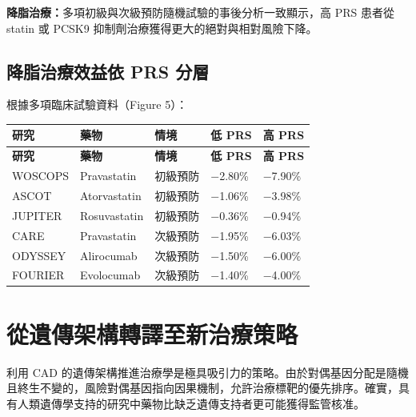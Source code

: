\documentclass[12pt,a4paper]{article}
\begin{document}
\textbf{降脂治療：}多項初級與次級預防隨機試驗的事後分析一致顯示，高 PRS 患者從 statin 或 PCSK9 抑制劑治療獲得更大的絕對與相對風險下降。

\subsection{降脂治療效益依 PRS 分層}

根據多項臨床試驗資料（Figure 5）：

\begin{longtable}{p{3cm}p{2.5cm}p{2.5cm}p{2.5cm}p{2.5cm}}
\toprule
\textbf{研究} & \textbf{藥物} & \textbf{情境} & \textbf{低 PRS} & \textbf{高 PRS} \\
\midrule
\endfirsthead

\toprule
\textbf{研究} & \textbf{藥物} & \textbf{情境} & \textbf{低 PRS} & \textbf{高 PRS} \\
\midrule
\endhead

\bottomrule
\endfoot

WOSCOPS & Pravastatin & 初級預防 & $-$2.80\% & $-$7.90\% \\
\midrule
ASCOT & Atorvastatin & 初級預防 & $-$1.06\% & $-$3.98\% \\
\midrule
JUPITER & Rosuvastatin & 初級預防 & $-$0.36\% & $-$0.94\% \\
\midrule
CARE & Pravastatin & 次級預防 & $-$1.95\% & $-$6.03\% \\
\midrule
ODYSSEY & Alirocumab & 次級預防 & $-$1.50\% & $-$6.00\% \\
\midrule
FOURIER & Evolocumab & 次級預防 & $-$1.40\% & $-$4.00\% \\
\bottomrule
\end{longtable}


\section{從遺傳架構轉譯至新治療策略}

利用 CAD 的遺傳架構推進治療學是極具吸引力的策略。由於對偶基因分配是隨機且終生不變的，風險對偶基因指向因果機制，允許治療標靶的優先排序。確實，具有人類遺傳學支持的研究中藥物比缺乏遺傳支持者更可能獲得監管核准。
\end{document}
